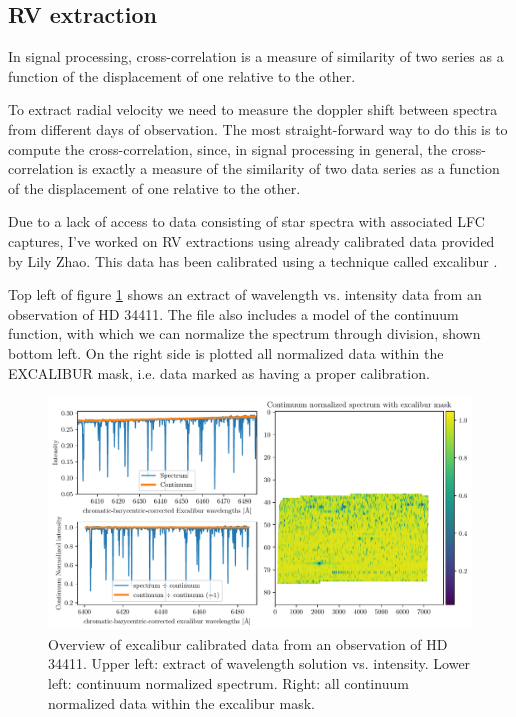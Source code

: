 
\subsection{RV extraction}

    In signal processing, cross-correlation is a measure of similarity of two series as a function 
    of the displacement of one relative to the other.

    To extract radial velocity we need to measure the doppler shift between spectra from different days of observation. The most straight-forward way to do this is to compute the cross-correlation, since, in signal processing in general, the cross-correlation is exactly a measure of the similarity of two data series as a function of the displacement of one relative to the other.

    Due to a lack of access to data consisting of star spectra with associated LFC captures, I've worked on RV extractions using already calibrated data provided by Lily Zhao. This data has been calibrated using a technique called excalibur \cite{zhao2021excalibur}.
    
    Top left of figure \ref{fig:rv_data_overview} shows an extract of wavelength vs. intensity data from an observation of HD 34411. The file also includes a model of the continuum function, with which we can normalize the spectrum through division, shown bottom left. On the right side is plotted all normalized data within the EXCALIBUR mask, i.e. data marked as having a proper calibration. 

    \begin{figure}%
        \begin{wide}  
            \includegraphics[width=\textwidth]{figures/rv_data_overview.pdf}
            \caption{Overview of excalibur calibrated data from an observation of HD 34411. Upper left: extract of wavelength solution vs. intensity. Lower left: continuum normalized spectrum. Right: all continuum normalized data within the excalibur mask.}
            \label{fig:rv_data_overview}
        \end{wide}
    \end{figure}
            
